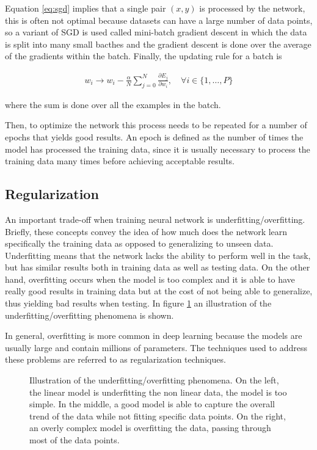 Equation \eqref{eq:sgd} implies that a single pair $(x,y)$ is processed by the network, this is often not optimal because datasets can have a large number of data points, so a variant of SGD is used called mini-batch gradient descent in which the data is split into many small bacthes and the gradient descent is done over the average of the gradients within the batch. Finally, the updating rule for a batch is

\begin{align*}
    w_i \xrightarrow{} w_i - \frac{\alpha}{N} \sum_{j=0}^N\frac{\partial E_j}{\partial w_i},\quad \forall i \in \{1,\ldots, P\} 
\end{align*}

where the sum is done over all the examples in the batch.

Then, to optimize the network this process needs to be repeated for a number of epochs that yields good results. An epoch is defined as the number of times the model has processed the training data, since it is usually necessary to process the training data many times before achieving acceptable results. 
\subsection{Regularization}

An important trade-off when training neural network is underfitting/overfitting. Briefly, these concepts convey the idea of how much does the network learn specifically the training data as opposed to generalizing to unseen data. Underfitting means that the network lacks the ability to perform well in the task, but has similar results both in training data as well as testing data. On the other hand, overfitting occurs when the model is too complex and it is able to have really good results in training data but at the cost of not being able to generalize, thus yielding bad results when testing. In figure \ref{fig:overfit} an illustration of the underfitting/overfitting phenomena is shown.

In general, overfitting is more common in deep learning because the models are usually large and contain millions of parameters. The techniques used to address these problems are referred to as regularization techniques.

\begin{figure}
    \centering
    \resizebox{\linewidth}{!}{
    
    }
    \caption[Illustration of the underfitting/overfitting phenomena]{Illustration of the underfitting/overfitting phenomena. On the left, the linear model is underfitting the non linear data, the model is too simple. In the middle, a good model is able to capture the overall trend of the data while not fitting specific data points. On the right, an overly complex model is overfitting the data, passing through most of the data points.}
   \label{fig:overfit}
\end{figure}

